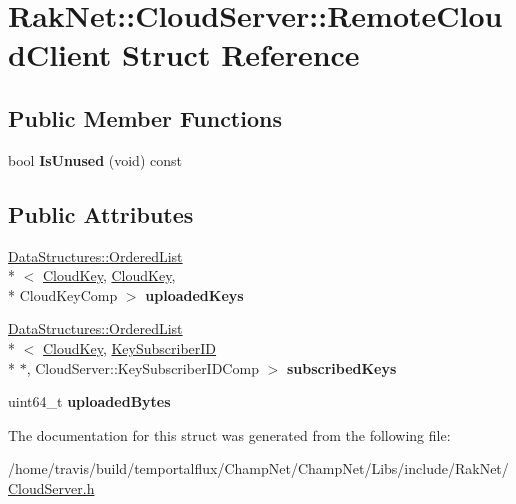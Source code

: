 \hypertarget{struct_rak_net_1_1_cloud_server_1_1_remote_cloud_client}{\section{Rak\-Net\-:\-:Cloud\-Server\-:\-:Remote\-Cloud\-Client Struct Reference}
\label{struct_rak_net_1_1_cloud_server_1_1_remote_cloud_client}
}
\subsection*{Public Member Functions}
\begin{DoxyCompactItemize}
\item 
\hypertarget{struct_rak_net_1_1_cloud_server_1_1_remote_cloud_client_ab93c9523999b5492f4f608c0653964cc}{bool {\bfseries Is\-Unused} (void) const }\label{struct_rak_net_1_1_cloud_server_1_1_remote_cloud_client_ab93c9523999b5492f4f608c0653964cc}

\end{DoxyCompactItemize}
\subsection*{Public Attributes}
\begin{DoxyCompactItemize}
\item 
\hypertarget{struct_rak_net_1_1_cloud_server_1_1_remote_cloud_client_a9f34fa27ec77774d765d0ee8b94e95d2}{\hyperlink{class_data_structures_1_1_ordered_list}{Data\-Structures\-::\-Ordered\-List}\\*
$<$ \hyperlink{struct_rak_net_1_1_cloud_key}{Cloud\-Key}, \hyperlink{struct_rak_net_1_1_cloud_key}{Cloud\-Key}, \\*
Cloud\-Key\-Comp $>$ {\bfseries uploaded\-Keys}}\label{struct_rak_net_1_1_cloud_server_1_1_remote_cloud_client_a9f34fa27ec77774d765d0ee8b94e95d2}

\item 
\hypertarget{struct_rak_net_1_1_cloud_server_1_1_remote_cloud_client_aeb55b58ace54c273a03990cf9408dad0}{\hyperlink{class_data_structures_1_1_ordered_list}{Data\-Structures\-::\-Ordered\-List}\\*
$<$ \hyperlink{struct_rak_net_1_1_cloud_key}{Cloud\-Key}, \hyperlink{struct_rak_net_1_1_cloud_server_1_1_key_subscriber_i_d}{Key\-Subscriber\-I\-D} \\*
$\ast$, Cloud\-Server\-::\-Key\-Subscriber\-I\-D\-Comp $>$ {\bfseries subscribed\-Keys}}\label{struct_rak_net_1_1_cloud_server_1_1_remote_cloud_client_aeb55b58ace54c273a03990cf9408dad0}

\item 
\hypertarget{struct_rak_net_1_1_cloud_server_1_1_remote_cloud_client_a7ecf3201b68f2e52b59d96f52e844726}{uint64\-\_\-t {\bfseries uploaded\-Bytes}}\label{struct_rak_net_1_1_cloud_server_1_1_remote_cloud_client_a7ecf3201b68f2e52b59d96f52e844726}

\end{DoxyCompactItemize}


The documentation for this struct was generated from the following file\-:\begin{DoxyCompactItemize}
\item 
/home/travis/build/temportalflux/\-Champ\-Net/\-Champ\-Net/\-Libs/include/\-Rak\-Net/\hyperlink{_cloud_server_8h}{Cloud\-Server.\-h}\end{DoxyCompactItemize}

